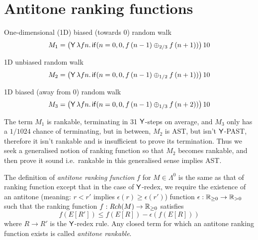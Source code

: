 \section{Antitone ranking functions}
\label{sec:antitone}

\begin{example}
\label{ex:ac-ranking}
\begin{compactenum}[(i)]
\item One-dimensional (1D) biased (towards 0) random walk
\[
M_1 = 
\big(\mathsf{Y} \, \lambda f n . \, 
\mathsf{if}(n = 0, 0, f \, (n - 1) \oplus_{2/3} f \, (n + 1))\big) \, 10
\]

\item 1D unbiased random walk
\[
M_2 = 
\big(\mathsf{Y} \, \lambda f n . \, 
\mathsf{if}(n = 0, 0, f \, (n - 1) \oplus_{1/2} f \, (n + 1))\big) \, 10
\]

\item 1D biased (away from 0) random walk
\[
M_3 = 
\big(\mathsf{Y} \, \lambda f n . \, 
\mathsf{if}(n = 0, 0, f \, (n - 1) \oplus_{1/3} f \, (n + 2))\big) \, 10
\]
\end{compactenum}
\end{example}

\medskip

The term $M_1$ is rankable, terminating in 31 $\tY$-steps on average, and $M_3$ only has a $1/1024$ chance of terminating, but in between, $M_2$ is AST, but isn't $\tY$-PAST, therefore it isn't rankable and  is insufficient to prove its termination. 
Thus we seek a generalised notion of ranking function so that $M_2$ becomes rankable, and then prove it sound i.e.~rankable in this generalised sense implies AST.


\begin{definition}
The definition of \emph{antitone ranking function} $f$ for $M \in \Lambda^0$ is the same as that of ranking function except that in the case of $\tY$-redex, 
we require the existence of an antitone (meaning: $r < r'$ implies $\epsilon(r) \geq \epsilon(r')$) function $\epsilon : \nnReal \to \pReal$ such that the ranking function $f :\mathit{Rch}(M) \to \mathbb{R}_{{\geq}0}$ satisfies
\[f(E[R']) \leq f(E[R]) - \epsilon(f(E[R])) \] 
where $R \to R'$ is the $\tY$-redex rule.
Any closed term for which an antitone ranking function exists is called \emph{antitone rankable}.
\iffalse
Given a ranking function $f$ on $M \in \Lambda^0$, we say that $f$ is \emph{antitone} if there exists an antitone function\footnote{i.e.~$r < r'$ implies $\epsilon(r) \geq \epsilon(r')$} $\epsilon : \nnReal \to \pReal$ such that %
\[
f(E[R']) \leq f(E[R]) - \epsilon(f(E[R])) 
\]
for all $E[R'] \in \mathit{Rch}(M)$ where $R \to R'$ is the $\tY$-redex rule.
\fi
\end{definition}

